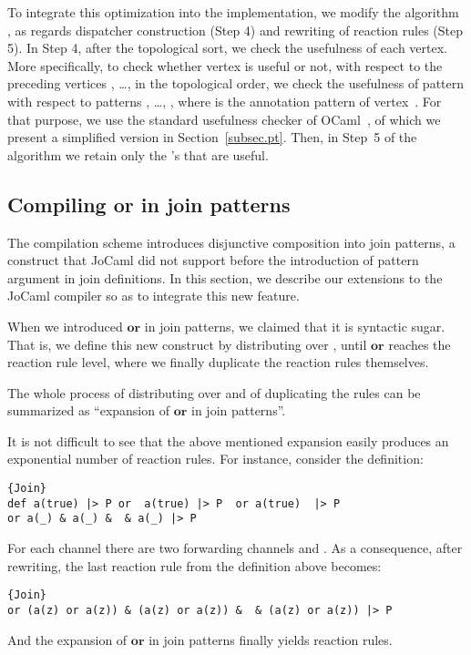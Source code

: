 \documentclass{LMCS}
\newcommand{\jocaml}{\textrm{JoCaml}\xspace}
\newcommand{\ocaml}{\textrm{OCaml}\xspace}
\newcommand{\kwd}[1]{\ensuremath{\mathbf{#1}}}
\renewcommand{\_}{\mathord{\rule[-.25ex]{1ex}{.15ex}}}
\begin{document}
To integrate this optimization into the implementation, we modify the
algorithm , as regards dispatcher construction (Step 4) and
rewriting of reaction rules (Step 5). In Step 4, after the topological
sort, we check the usefulness of each vertex.  More specifically, to
check whether vertex  is useful or not, with respect to the
preceding vertices , \ldots{},  in the topological
order, we check the usefulness of pattern  with respect to
patterns , \ldots{}, , where  is the
annotation pattern of vertex~. For that purpose, we use the
standard usefulness checker of \ocaml~\cite{warning}, of which we
present a simplified version in Section~\ref{subsec.pt}.  Then, in
Step~5 of the algorithm we retain only the 's that are useful.

\subsection{Compiling \textbf{or} in join patterns}
\label{subsec.share}

The compilation scheme  introduces disjunctive composition
into join patterns, a construct that \jocaml did not support before
the introduction of pattern argument in join definitions. In this
section, we describe our extensions to the \jocaml compiler so as to
integrate this new feature.

When we introduced \kwd{or} in join patterns, we claimed that it is
syntactic sugar. That is, we define this new construct by distributing 
 over , until \kwd{or} reaches the reaction rule
level, where we finally duplicate the reaction rules themselves.

The whole process of distributing  over  and of
duplicating the rules can be summarized as ``expansion of \kwd{or} in
join patterns''.

It is not difficult to see that the above mentioned expansion easily
produces an exponential number of reaction rules.
For instance, consider the definition:
\begin{lstlisting}{Join}
def a(true) |> P or  a(true) |> P  or a(true)  |> P
or a(_) & a(_) &  & a(_) |> P
\end{lstlisting}
For each channel  there are two forwarding channels
 and .
As a consequence, after rewriting, the last reaction rule from the definition
above becomes:
\begin{lstlisting}{Join}
or (a(z) or a(z)) & (a(z) or a(z)) &  & (a(z) or a(z)) |> P
\end{lstlisting}
And the expansion of \kwd{or} in join patterns finally yields 
reaction rules.
\end{document}
